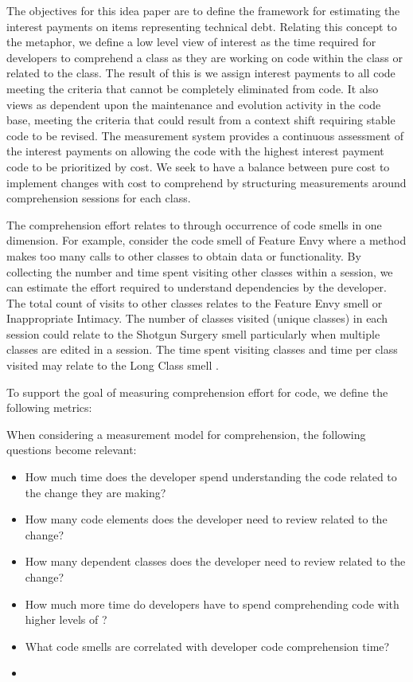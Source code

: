 The objectives for this idea paper are to define the framework for estimating the interest payments on items representing technical debt.  Relating this concept to the \TD  metaphor, we define a low level view of interest as the time required for developers to comprehend a class as they are working on code within the class or related to the class.   The result of this is we assign interest payments to all code meeting the criteria that \TD cannot be completely eliminated from code.  It also views \TD as dependent upon the maintenance and evolution activity in the code base, meeting the criteria that \TD could result from a context shift requiring stable code to be revised. The measurement system provides a continuous assessment of the interest payments on \TD allowing the code with the highest interest payment code to be prioritized by cost.  We seek to have a balance between pure cost to implement changes with cost to comprehend by structuring measurements around comprehension sessions for each class.

The comprehension effort relates to \TD through occurrence of code smells in one dimension.  For example, consider the code smell of Feature Envy  where a method makes too many calls to other classes to obtain data or functionality.  By collecting the number and time spent visiting other classes within a session, we can estimate the effort required to understand dependencies by the developer.  The total count of visits to other classes relates to the Feature Envy smell or Inappropriate Intimacy.  The number of classes visited (unique classes) in each session could  relate to the Shotgun Surgery smell particularly when multiple classes are edited in a session.  The time spent visiting classes and time per class visited may relate to the Long Class smell \cite{Fowler_etal:1999}.  



To support the goal of measuring comprehension effort for code, we define the following metrics:

When considering a measurement model for comprehension, the following questions become relevant:

\begin{itemize}
	\item[] How much time does the developer spend understanding the code related to the change they are making?
	\item[] How many code elements does the developer need to review related to the change?
	\item[] How many dependent classes does the developer need to review related to the change?
	\item[] How much more time do developers have to spend comprehending code with higher levels of \TD?
	\item[] What code smells are correlated with developer code comprehension time?
	\item[] 
\end{itemize}

